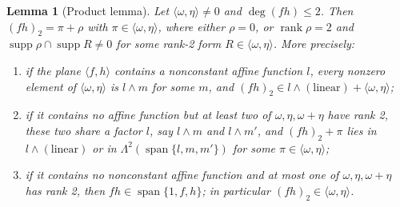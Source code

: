 \documentclass[11pt,a4paper]{article}
\theoremstyle{plain}
\newtheorem{lemma}[theorem]{Lemma}
\theoremstyle{remark}
\newcommand{\Span}{\operatorname{span}}
\newcommand{\supp}{\operatorname{supp}}
\newcommand{\rk}{\operatorname{rank}}
\newcommand{\Lam}{\Lambda^2}
\begin{document}
\begin{lemma}[Product lemma]\label{l3:lem:P}
Let $\langle\omega,\eta\rangle\neq0$ and $\deg(fh)\le 2$. Then $(fh)_2=\pi+\rho$ with $\pi\in\langle\omega,\eta\rangle$, where either $\rho=0$, or $\rk\rho=2$ and $\supp\rho\cap\supp R\neq0$ for some rank-2 form $R\in\langle\omega,\eta\rangle$. More precisely:
\begin{enumerate}[(P1)]
\item if the plane $\langle f,h\rangle$ contains a nonconstant affine function $l$, every nonzero element of $\langle\omega,\eta\rangle$ is $l\wedge m$ for some $m$, and $(fh)_2\in l\wedge(\text{linear})+\langle\omega,\eta\rangle$;
\item if it contains no affine function but at least two of $\omega,\eta,\omega+\eta$ have rank 2, these two share a factor $l$, say $l\wedge m$ and $l\wedge m'$, and $(fh)_2+\pi$ lies in $l\wedge(\text{linear})$ or in $\Lam(\Span\{l,m,m'\})$ for some $\pi\in\langle\omega,\eta\rangle$;
\item if it contains no nonconstant affine function and at most one of $\omega,\eta,\omega+\eta$ has rank 2, then $fh\in\Span\{1,f,h\}$; in particular $(fh)_2\in\langle\omega,\eta\rangle$.
\end{enumerate}
\end{lemma}
\end{document}
